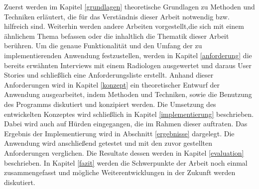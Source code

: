 Zuerst werden im  Kapitel \ref{grundlagen} theoretische Grundlagen zu Methoden und Techniken erläutert, die für das Verständnis dieser Arbeit notwendig bzw. hilfreich sind. Weiterhin werden andere Arbeiten vorgestellt,die sich mit einem ähnlichem Thema befassen oder die inhaltlich die Thematik dieser Arbeit berühren.
Um die genaue Funktionalität und den Umfang der zu implementierenden Anwendung festzustellen, werden in Kapitel \ref{anforderung} die bereits erwähnten Interviews mit einem Radiologen ausgewertet und daraus User Stories und schließlich eine Anforderungsliste erstellt.
Anhand dieser Anforderungen wird in Kapitel \ref{konzept} ein theoretischer Entwurf der Anwendung ausgearbeitet, indem Methoden und Techniken, sowie die Benutzung des Programms diskutiert und konzipiert werden.
Die Umsetzung des entwickelten Konzeptes wird schließlich in Kapitel \ref{implementierung} beschrieben. Dabei wird auch auf Hürden eingegangen, die im Rahmen dieser auftraten.
Das Ergebnis der Implementierung wird in Abschnitt \ref{ergebnisse} dargelegt.
Die Anwendung wird anschließend getestet und mit den zuvor gestellten Anforderungen verglichen. Die Resultate dessen werden in Kapitel \ref{evaluation} beschrieben. 
In Kapitel \ref{fazit} werden die Schwerpunkte der Arbeit noch einmal zusammengefasst und mögliche Weiterentwicklungen in der Zukunft werden diskutiert. 
 